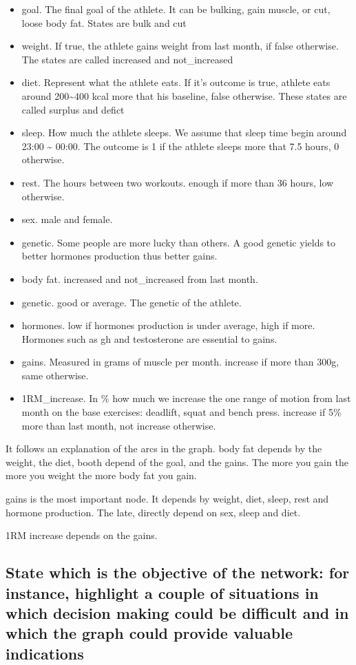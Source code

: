 \documentclass[11pt]{article}
\begin{document}
\begin{itemize}
\item
  goal. The final goal of the athlete. It can be bulking, gain muscle, or
  cut, loose body fat. States are bulk and cut
\item
  weight. If true, the athlete gains weight from last month, if false
  otherwise. The states are called increased and not\_increased
\item
  diet. Represent what the athlete eats. If it's outcome is true, athlete
  eats around 200\textasciitilde{}400 kcal more that his baseline, false
  otherwise. These states are called surplus and defict
\item
  sleep. How much the athlete sleeps. We assume that sleep time begin
  around 23:00 \textasciitilde{} 00:00. The outcome is 1 if the athlete
  sleeps more that 7.5 hours, 0 otherwise.
\item
  rest. The hours between two workouts. enough if more than 36 hours,
  low otherwise.
\item
  sex. male and female.
\item genetic. Some people are more lucky than others. A good genetic yields to better hormones production  thus better gains.
\item
  body fat. increased and not\_increased from last month.
\item
  genetic. good or average. The genetic of the athlete.
\item
  hormones. low if hormones production is under average, high if more.
  Hormones such as gh and testosterone are essential to gains.
\item
  gains. Measured in grams of muscle per month. increase if more than
  300g, same otherwise.
\item
  1RM\_increase. In \% how much we increase the one range of motion from
  last month on the base exercises: deadlift, squat and bench press.
  increase if 5\% more than last month, not increase otherwise.
\end{itemize}
It follows an explanation of the arcs in the graph. body fat depends by
the weight, the diet, booth depend of the goal, and the gains. The more
you gain the more you weight the more body fat you gain.

gains is the most important node. It depends by weight, diet, sleep,
rest and hormone production. The late, directly depend on sex, sleep and
diet.

1RM increase depends on the gains.

\subsection{State which is the objective of the network: for instance, highlight a couple of situations in which decision making could be difficult and in which the graph could provide valuable indications}
\end{document}
